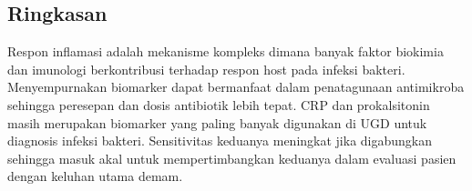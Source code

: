 \documentclass[
  10pt,
  letterpaper,
]{article}
\begin{document}
\subsection{Ringkasan}\label{ringkasan}

Respon inflamasi adalah mekanisme kompleks dimana banyak faktor biokimia
dan imunologi berkontribusi terhadap respon host pada infeksi bakteri.
Menyempurnakan biomarker dapat bermanfaat dalam penatagunaan antimikroba
sehingga peresepan dan dosis antibiotik lebih tepat. CRP dan
prokalsitonin masih merupakan biomarker yang paling banyak digunakan di
UGD untuk diagnosis infeksi bakteri. Sensitivitas keduanya meningkat
jika digabungkan sehingga masuk akal untuk mempertimbangkan keduanya
dalam evaluasi pasien dengan keluhan utama demam.


\nolinenumbers
  
\end{document}
